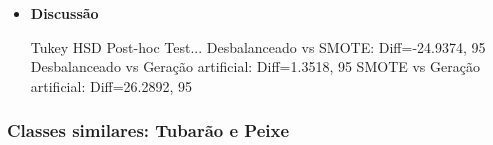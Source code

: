 \begin{itemize}
\item[] \textbf{Discussão}

Tukey HSD Post-hoc Test...
Desbalanceado vs SMOTE: Diff=-24.9374, 95%
Desbalanceado vs Geração artificial: Diff=1.3518, 95%
SMOTE vs Geração artificial: Diff=26.2892, 95%

\end{itemize}

\subsubsection{Classes similares: Tubarão e Peixe}

